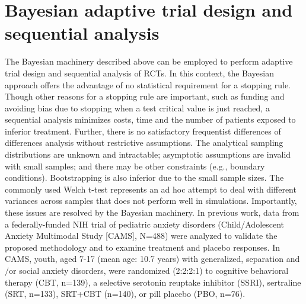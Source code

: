 \documentclass{juliacon}
\begin{document}
\section{Bayesian adaptive trial design and sequential analysis}
The Bayesian machinery described above can be employed to perform adaptive trial design and sequential analysis of RCTs. In this context, the Bayesian approach offers the advantage of no statistical requirement for a stopping rule. Though other reasons for a stopping rule are important, such as funding and avoiding bias due to stopping when a test critical value is just reached, a sequential analysis minimizes costs, time and the number of patients exposed to inferior treatment. Further, there is no satisfactory frequentist differences of differences analysis without restrictive assumptions. The analytical sampling distributions are unknown and intractable; asymptotic assumptions are invalid with small samples; and there may be other constraints (e.g., boundary conditions). Bootstrapping is also inferior due to the small sample sizes. The commonly used Welch t-test represents an ad hoc attempt to deal with different variances across samples that does not perform well in simulations\cite{Mills2019}.  Importantly, these issues are resolved by the Bayesian machinery.
\vskip 6pt
In previous work\cite{Strawn2018,Mills2019}, data from a federally-funded NIH trial of pediatric anxiety disorders (Child/Adolescent Anxiety Multimodal Study [CAMS], N=488) were analyzed to validate the proposed methodology and to examine treatment and placebo responses. In CAMS, youth, aged 7-17 (mean age: 10.7 years) with generalized, separation and$/$or social anxiety disorders, were randomized (2:2:2:1) to cognitive behavioral therapy (CBT, n=139), a selective serotonin reuptake inhibitor (SSRI), sertraline (SRT, n=133), SRT+CBT (n=140), or pill placebo (PBO, n=76).
\vskip 6pt
\end{document}
